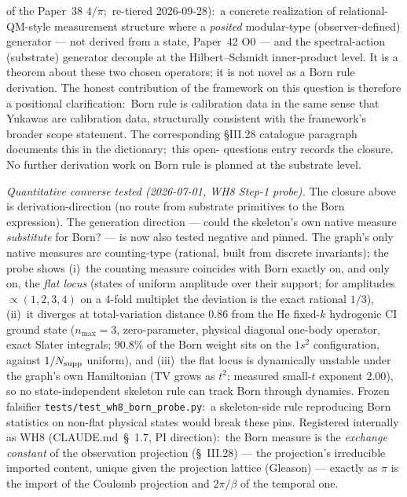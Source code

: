 \documentclass[11pt]{article}
\begin{document}
\begin{enumerate}
of the Paper~38 $4/\pi$;\ re-tiered 2026-09-28):\ a concrete realization
of relational-QM-style measurement structure where a \emph{posited}
modular-type (observer-defined) generator --- not derived from a state,
Paper~42 O0 --- and the spectral-action (substrate) generator decouple at
the Hilbert--Schmidt inner-product level.  It is a theorem about these
two chosen operators;
it is not novel as a Born rule derivation.  The honest contribution
of the framework on this question is therefore a positional
clarification:\ Born rule is calibration data in the same sense that
Yukawas are calibration data, structurally consistent with the
framework's broader scope statement.  The corresponding §III.28
catalogue paragraph documents this in the dictionary;\ this open-
questions entry records the closure.  No further derivation work on
Born rule is planned at the substrate level.

\emph{Quantitative converse tested (2026-07-01, WH8 Step-1 probe).}
The closure above is derivation-direction (no route from substrate
primitives to the Born expression).  The generation direction ---
could the skeleton's own native measure \emph{substitute} for Born?
--- is now also tested negative and pinned.  The graph's only native
measures are counting-type (rational, built from discrete
invariants); the probe shows (i)~the counting measure coincides with
Born exactly on, and only on, the \emph{flat locus} (states of
uniform amplitude over their support; for amplitudes
$\propto(1,2,3,4)$ on a 4-fold multiplet the deviation is the exact
rational $1/3$), (ii)~it diverges at total-variation distance $0.86$
from the He fixed-$k$ hydrogenic CI ground state ($n_{\max}=3$,
zero-parameter, physical diagonal one-body operator, exact Slater
integrals; $90.8\%$ of the Born weight
sits on the $1s^2$ configuration, against $1/N_{\rm supp}$ uniform),
and (iii)~the flat locus is dynamically unstable under the graph's
own Hamiltonian (TV grows as $t^2$; measured small-$t$ exponent
$2.00$), so no state-independent skeleton rule can track Born
through dynamics.  Frozen falsifier
\texttt{tests/test\_wh8\_born\_probe.py}:\ a skeleton-side rule
reproducing Born statistics on non-flat physical states would break
these pins.  Registered internally as WH8 (CLAUDE.md~\S~1.7,
PI direction):\ the Born measure is the \emph{exchange constant} of
the observation projection (\S~III.28) --- the projection's
irreducible imported content, unique given the projection lattice
(Gleason) --- exactly as $\pi$ is the import of the Coulomb
projection and $2\pi/\beta$ of the temporal one.

\end{enumerate}
\end{document}
